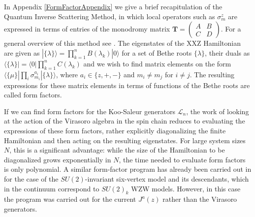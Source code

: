 \documentclass[a4paper,10pt]{article}
\newcommand{\hubert}[1]{$\framebox{\tiny h}$\ \textbf{\texttt{{\color{blue}\footnotesize#1}}}}
\newcommand{\jesper}[1]{$\framebox{\tiny J}$\ \textbf{\texttt{{\color{cyan}\footnotesize#1}}}}
\newcommand{\KSgen}{\mathcal{L}}
\begin{document}


In Appendix \ref{FormFactorAppendix} we give a brief recapitulation of the Quantum Inverse Scattering Method, in which local operators such as $\sigma^z_m$ are expressed in terms of entries of the monodromy matrix $\mathbf{T}= \left( \begin{smallmatrix}
A&B\\
C&D
\end{smallmatrix} \right)$. For a general overview of this method see \cite{Slavnov}. The eigenstates of the XXZ Hamiltonian are given as $|\{\lambda\}\rangle = \prod_{k=1}^nB(\lambda_k)|0\rangle$ for a set of Bethe roots $\{\lambda\}$, their duals as $\langle \{\lambda\}| =\langle 0 | \prod_{k=1}^nC(\lambda_k)$ and we wish to find matrix elements on the form $\langle \{\mu\}|\prod_i\sigma^{a_i}_{m_i}|\{\lambda\}\rangle$, where $a_i \in\{z,+,-\}$ and $m_i\neq m_j$ for $i\neq j$.
 The resulting expressions for these matrix elements in terms of functions of the Bethe roots are called form factors.

If we can find form factors for the Koo-Saleur generators $\KSgen_n$, the work of looking at the action of the Virasoro algebra in the spin chain reduces to evaluating the expressions of these form factors, rather explicitly diagonalizing the finite Hamiltonian and then acting on the resulting eigenstates. For large system sizes $N$, this is a significant advantage: while the size of the Hamiltonian to be diagonalized grows exponentially in $N$, the time needed to evaluate form factors is only polynomial.
%
%
A similar form-factor program has already been carried out in \cite{Bondesan} for the case of the $SU(2)$-invariant six-vertex model and its descendants, which in the continuum correspond to $SU(2)_k$ WZW models. However, in this case the program was carried out for the current $J^a(z)$ rather than the Virasoro generators.
\end{document}
